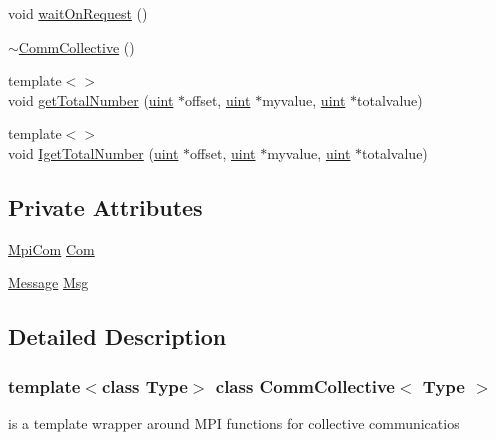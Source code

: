 \begin{DoxyCompactItemize}
void \mbox{\hyperlink{classCommCollective_af9b5d68df879f888a107009d783e20f6}{wait\+On\+Request}} ()
\item 
\mbox{\hyperlink{classCommCollective_ac3c4de03f00fb8f4fa578f23883e4943}{$\sim$\+Comm\+Collective}} ()
\item 
{\footnotesize template$<$$>$ }\\void \mbox{\hyperlink{classCommCollective_a493fba4b35a6f42599753b48c431684a}{get\+Total\+Number}} (\mbox{\hyperlink{definitions_8h_a69aa29b598b851b0640aa225a9e5d61d}{uint}} $\ast$offset, \mbox{\hyperlink{definitions_8h_a69aa29b598b851b0640aa225a9e5d61d}{uint}} $\ast$myvalue, \mbox{\hyperlink{definitions_8h_a69aa29b598b851b0640aa225a9e5d61d}{uint}} $\ast$totalvalue)
\item 
{\footnotesize template$<$$>$ }\\void \mbox{\hyperlink{classCommCollective_a2603f0331222a5f76a29a0bf3a187ae4}{Iget\+Total\+Number}} (\mbox{\hyperlink{definitions_8h_a69aa29b598b851b0640aa225a9e5d61d}{uint}} $\ast$offset, \mbox{\hyperlink{definitions_8h_a69aa29b598b851b0640aa225a9e5d61d}{uint}} $\ast$myvalue, \mbox{\hyperlink{definitions_8h_a69aa29b598b851b0640aa225a9e5d61d}{uint}} $\ast$totalvalue)
\end{DoxyCompactItemize}
\subsection*{Private Attributes}
\begin{DoxyCompactItemize}
\item 
\mbox{\hyperlink{structMpiCom}{Mpi\+Com}} \mbox{\hyperlink{classCommCollective_aec8e1d1172950f2f5a2f47a50de151e7}{Com}}
\item 
\mbox{\hyperlink{structMessage}{Message}} \mbox{\hyperlink{classCommCollective_a2c03a93c4ffd512939d2b98cb7761224}{Msg}}
\end{DoxyCompactItemize}


\subsection{Detailed Description}
\subsubsection*{template$<$class Type$>$\newline
class Comm\+Collective$<$ Type $>$}

is a template wrapper around M\+PI functions for collective communicatios 

